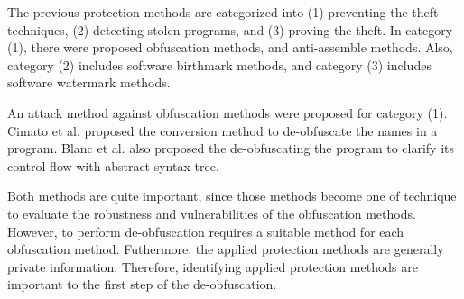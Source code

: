\documentclass[conference]{IEEEtran}
\begin{document}
The previous protection methods are categorized into (1) preventing
the theft techniques, (2) detecting stolen programs, and (3) proving
the theft\cite{collberg09surreptitious}.
%
In category (1), there were proposed obfuscation methods, and
anti-assemble methods\cite{tyma00patent,monden97ieice}.  Also,
category (2) includes software birthmark
methods\cite{tamada04iasted,tamada05ieice}, and category (3) includes
software watermark methods\cite{collberg99popl}.

An attack method against obfuscation methods were proposed for
category (1)\cite{cimato05jss}.
%
Cimato et al. proposed the conversion method to de-obfuscate the names
in a program.
%
Blanc et al. also proposed the de-obfuscating the program to clarify
its control flow with abstract syntax tree\cite{preda06amast}.

Both methods are quite important, since those methods become one of
technique to evaluate the robustness and vulnerabilities of the
obfuscation methods.  However, to perform de-obfuscation requires a
suitable method for each obfuscation method.  Futhermore, the applied
protection methods are generally private information.  Therefore,
identifying applied protection methods are important to the first step
of the de-obfuscation.

% 
\end{document}
